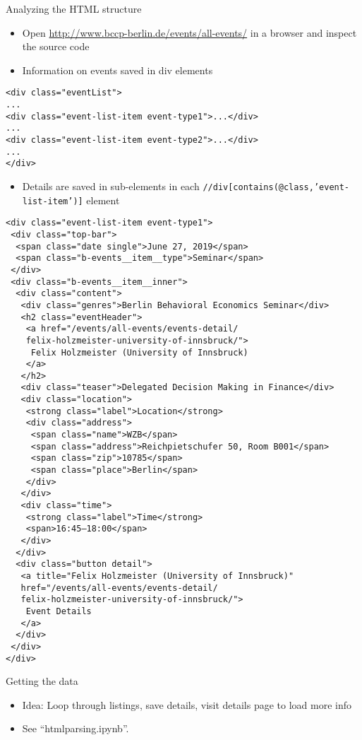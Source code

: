 \begin{frame}{Analyzing the HTML structure}
\begin{itemize}
	\item Open \url{http://www.bccp-berlin.de/events/all-events/} in a browser and inspect the source code
	\item Information on events saved in div elements
\end{itemize}
\begin{verbatim}
<div class="eventList">
...
<div class="event-list-item event-type1">...</div>
...
<div class="event-list-item event-type2">...</div>
...
</div>
\end{verbatim}

\framebreak

\begin{itemize}
	\item Details are saved in sub-elements in each \texttt{//div[contains(@class,'event-list-item')]} element
\end{itemize}
\begin{verbatim}
<div class="event-list-item event-type1">
 <div class="top-bar">
  <span class="date single">June 27, 2019</span>
  <span class="b-events__item__type">Seminar</span>
 </div>
 <div class="b-events__item__inner">
  <div class="content">
   <div class="genres">Berlin Behavioral Economics Seminar</div>
   <h2 class="eventHeader">
    <a href="/events/all-events/events-detail/
    felix-holzmeister-university-of-innsbruck/">
     Felix Holzmeister (University of Innsbruck)
    </a>
   </h2>
   <div class="teaser">Delegated Decision Making in Finance</div>
   <div class="location">
    <strong class="label">Location</strong>
    <div class="address">
     <span class="name">WZB</span>
     <span class="address">Reichpietschufer 50, Room B001</span>
     <span class="zip">10785</span>
     <span class="place">Berlin</span>
    </div>
   </div>
   <div class="time">
    <strong class="label">Time</strong>
    <span>16:45–18:00</span>
   </div>
  </div>
  <div class="button detail">
   <a title="Felix Holzmeister (University of Innsbruck)" 
   href="/events/all-events/events-detail/
   felix-holzmeister-university-of-innsbruck/">
    Event Details
   </a>
  </div>
 </div>
</div>
\end{verbatim}
\end{frame}

\begin{frame}{Getting the data}
\begin{itemize}
	\item Idea: Loop through listings, save details, visit details page to load more info
	\item See ``htmlparsing.ipynb''.
\end{itemize}
\end{frame}

